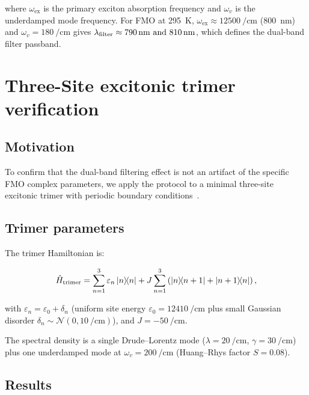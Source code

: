 \documentclass[11pt,a4paper]{article}
\begin{document}
where $\omega_{\mathrm{ex}}$ is the primary exciton absorption frequency and $\omega_v$ is the underdamped mode frequency.
For FMO at \qty{295}{\kelvin}, $\omega_{\mathrm{ex}} \approx \qty{12500}{\per\cm}$ (\qty{800}{\nm}) and $\omega_v = \qty{180}{\per\cm}$ gives $\lambda_{\mathrm{filter}} \approx \qtylist{790;810}{\nm}$, which defines the dual-band filter passband.


\section{Three-Site excitonic trimer verification}
\label{SI-sec:3site}

\subsection{Motivation}

To confirm that the dual-band filtering effect is not an artifact of the specific FMO complex parameters, we apply the protocol to a minimal three-site excitonic trimer with periodic boundary conditions~\cite{Mohseni2008,Rebentrost2009,Chin2010}.

\subsection{Trimer parameters}

The trimer Hamiltonian is:

\begin{equation}
\hat{H}_{\mathrm{trimer}} = \sum_{n=1}^{3} \varepsilon_n \dyad{n} + J \sum_{n=1}^{3} \left( \dyad{n}{n+1} + \dyad{n+1}{n} \right),
\label{eq:SI_trimer_hamiltonian}
\end{equation}

with $\varepsilon_n = \varepsilon_0 + \delta_n$ (uniform site energy $\varepsilon_0 = \qty{12410}{\per\cm}$ plus small Gaussian disorder $\delta_n \sim \mathcal{N}(0, \qty{10}{\per\cm})$), and $J = \qty{-50}{\per\cm}$.

The spectral density is a single Drude--Lorentz mode ($\lambda = \qty{20}{\per\cm}$, $\gamma = \qty{30}{\per\cm}$) plus one underdamped mode at $\omega_v = \qty{200}{\per\cm}$ (Huang--Rhys factor $S = 0.08$).

\subsection{Results}
\end{document}
